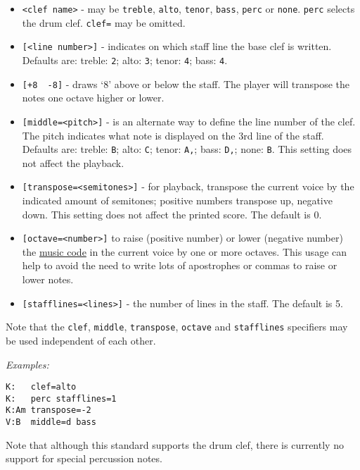 \begin{itemize}
\item
  \texttt{\textless{}clef\ name\textgreater{}} - may be \texttt{treble},
  \texttt{alto}, \texttt{tenor}, \texttt{bass}, \texttt{perc} or
  \texttt{none}. \texttt{perc} selects the drum clef. \texttt{clef=} may
  be omitted.
\item
  \texttt{{[}\textless{}line\ number\textgreater{}{]}} - indicates on
  which staff line the base clef is written. Defaults are: treble:
  \texttt{2}; alto: \texttt{3}; tenor: \texttt{4}; bass: \texttt{4}.
\item
  \texttt{{[}+8\ \textbar{}\ -8{]}} - draws `8' above or below the
  staff. The player will transpose the notes one octave higher or lower.
\item
  \texttt{{[}middle=\textless{}pitch\textgreater{}{]}} - is an alternate
  way to define the line number of the clef. The pitch indicates what
  note is displayed on the 3rd line of the staff. Defaults are: treble:
  \texttt{B}; alto: \texttt{C}; tenor: \texttt{A,}; bass: \texttt{D,};
  none: \texttt{B}. This setting does not affect the playback.
\item
  \texttt{{[}transpose=\textless{}semitones\textgreater{}{]}} - for
  playback, transpose the current voice by the indicated amount of
  semitones; positive numbers transpose up, negative down. This setting
  does not affect the printed score. The default is 0.
\item
  \texttt{{[}octave=\textless{}number\textgreater{}{]}} to raise
  (positive number) or lower (negative number) the
  \protect\hyperlink{music_code_definition}{music code} in the current
  voice by one or more octaves. This usage can help to avoid the need to
  write lots of apostrophes or commas to raise or lower notes.
\item
  \texttt{{[}stafflines=\textless{}lines\textgreater{}{]}} - the number
  of lines in the staff. The default is 5.
\end{itemize}

Note that the \texttt{clef}, \texttt{middle}, \texttt{transpose},
\texttt{octave} and \texttt{stafflines} specifiers may be used
independent of each other.

\emph{Examples:}

\begin{verbatim}
K:   clef=alto
K:   perc stafflines=1
K:Am transpose=-2
V:B  middle=d bass
\end{verbatim}

Note that although this standard supports the drum clef, there is
currently no support for special percussion notes.

